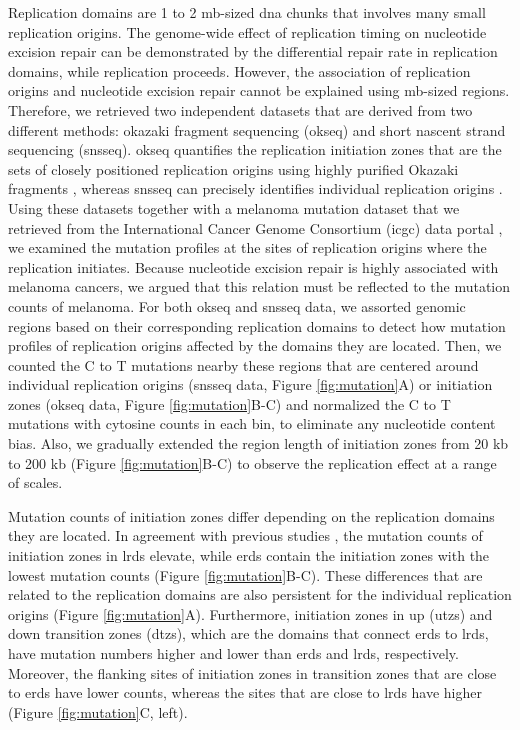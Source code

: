 Replication domains are 1 to 2 \gls{mb}-sized \gls{dna} chunks that involves many small replication origins. The genome-wide effect of replication timing on nucleotide excision repair can be demonstrated by the differential repair rate in replication domains, while replication proceeds. However, the association of replication origins and nucleotide excision repair cannot be explained using \gls{mb}-sized regions. Therefore, we retrieved two independent datasets that are derived from two different methods: okazaki fragment sequencing (\gls{okseq}) and short nascent strand sequencing (\gls{snsseq}). \gls{okseq} quantifies the replication initiation zones that are the sets of closely positioned replication origins using highly purified Okazaki fragments \citep{petryk2016replication}, whereas \gls{snsseq} can precisely identifies individual replication origins \citep{besnard2012unraveling,langley2016genome}. Using these datasets together with a melanoma mutation dataset that we retrieved from the International Cancer Genome Consortium (\gls{icgc}) data portal \citep{hayward2017whole}, we examined the mutation profiles at the sites of replication origins where the replication initiates. Because nucleotide excision repair is highly associated with melanoma cancers, we argued that this relation must be reflected to the mutation counts of melanoma. For both \gls{okseq} and \gls{snsseq} data, we assorted genomic regions based on their corresponding replication domains to detect how mutation profiles of replication origins affected by the domains they are located. Then, we counted the \gls{C} to \gls{T} mutations nearby these regions that are centered around individual replication origins (\gls{snsseq} data, Figure \ref{fig:mutation}A) or initiation zones (\gls{okseq} data, Figure \ref{fig:mutation}B-C) and normalized the \gls{C} to \gls{T} mutations with cytosine counts in each bin, to eliminate any nucleotide content bias. Also, we gradually extended the region length of initiation zones from 20 \gls{kb} to 200 \gls{kb} (Figure \ref{fig:mutation}B-C) to observe the replication effect at a range of scales.

Mutation counts of initiation zones differ depending on the replication domains they are located. In agreement with previous studies \citep{lawrence2013mutational,schuster2012chromatin,stamatoyannopoulos2009human}, the mutation counts of initiation zones in \gls{lrd}s elevate, while \gls{erd}s contain the initiation zones with the lowest mutation counts (Figure \ref{fig:mutation}B-C). These differences that are related to the replication domains are also persistent for the individual replication origins (Figure \ref{fig:mutation}A). Furthermore, initiation zones in up (\gls{utz}s) and down transition zones (\gls{dtz}s), which are the domains that connect \gls{erd}s to \gls{lrd}s, have mutation numbers higher and lower than \gls{erd}s and \gls{lrd}s, respectively. Moreover, the flanking sites of initiation zones in transition zones that are close to \gls{erd}s have lower counts, whereas the sites that are close to \gls{lrd}s have higher (Figure \ref{fig:mutation}C, left). 

